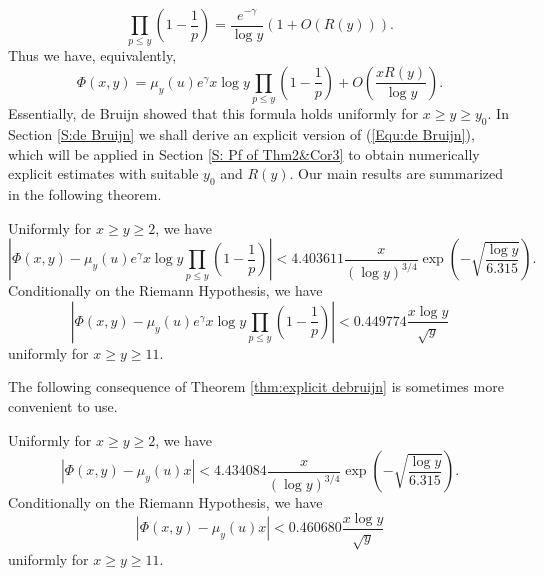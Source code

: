 \documentclass[12pt,reqno]{amsart}
\begin{document}
\[\prod_{p\leq y}\left(1-\frac{1}{p}\right)=\frac{e^{-\gamma}}{\log y}\left(1+O(R(y))\right).\]
Thus we have, equivalently,
\begin{equation}\label{Equ:de Bruijn}
	\Phi(x,y)=\mu_y(u)e^{\gamma}x\log y\prod_{p\leq y}\left(1-\frac{1}{p}\right)+O\left(\frac{xR(y)}{\log y}\right).
\end{equation}
Essentially, de Bruijn \cite{Br} showed that this formula holds uniformly for $x\ge y\ge y_0$. In Section \ref{S:de Bruijn} we shall derive an explicit version of (\ref{Equ:de Bruijn}), which will be applied in Section \ref{S: Pf of Thm2&Cor3} to obtain numerically explicit estimates with suitable $y_0$ and $R(y)$. Our main results are summarized in the following theorem.
\begin{thm}\label{thm:explicit debruijn}
Uniformly for $x\ge y\ge 2$, we have
\[\left|\Phi(x,y)-\mu_y(u)e^{\gamma}x\log y\prod_{p\leq y}\left(1-\frac{1}{p}\right)\right|< 4.403611\frac{x}{(\log y)^{3/4}}\exp\left(-\sqrt{\frac{\log y}{6.315}}\right).\]
Conditionally on the Riemann Hypothesis, we have
\[\left|\Phi(x,y)-\mu_y(u)e^{\gamma}x\log y\prod_{p\leq y}\left(1-\frac{1}{p}\right)\right|<0.449774\frac{x\log y}{\sqrt{y}}\]
uniformly for $x\ge y\ge 11$. 
\end{thm}
The following consequence of Theorem \ref{thm:explicit debruijn} is sometimes more convenient to use.
\begin{cor}\label{cor::explicit debruijn}
Uniformly for $x\ge y\ge 2$, we have
\[|\Phi(x,y)-\mu_y(u)x|< 4.434084\frac{x}{(\log y)^{3/4}}\exp\left(-\sqrt{\frac{\log y}{6.315}}\right).\]
Conditionally on the Riemann Hypothesis, we have
\[|\Phi(x,y)-\mu_y(u)x|< 0.460680\frac{x\log y}{\sqrt{y}}\]
uniformly for $x\ge y\ge 11$. 
\end{cor}

\vspace*{2mm}
\end{document}

